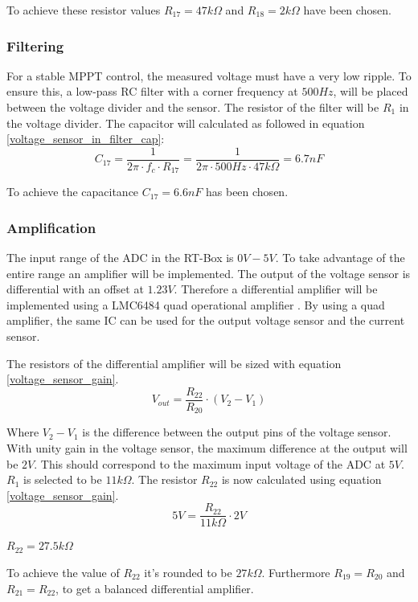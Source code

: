 To achieve these resistor values $R_{17} = 47k\Omega$ and $R_{18} = 2k\Omega$ have been chosen. 

\subsubsection{Filtering} \label{voltage_sensor_filter}
For a stable MPPT control, the measured voltage must have a very low ripple. To ensure this, a low-pass RC filter with a corner frequency at $500Hz$, will be placed between the voltage divider and the sensor. The resistor of the filter will be $R_1$ in the voltage divider. The capacitor will calculated as followed in equation \ref{voltage_sensor_in_filter_cap}:
\begin{equation} \label{voltage_sensor_in_filter_cap}
	C_{17} = \frac{1}{2\pi \cdot f_c \cdot R_{17}} = \frac{1}{2 \pi \cdot 500Hz \cdot 47k\Omega} = 6.7nF
\end{equation}

To achieve the capacitance $C_{17} = 6.6nF$ has been chosen. 

\subsubsection{Amplification} \label{voltage_sensor_amplification}
The input range of the ADC in the RT-Box is $0V-5V$. To take advantage of the entire range an amplifier will be implemented. The output of the voltage sensor is differential with an offset at $1.23V$. Therefore a differential amplifier will be implemented using a LMC6484 quad operational amplifier \cite{sensor_opamp}. By using a quad amplifier, the same IC can be used for the output voltage sensor and the current sensor.

The resistors of the differential amplifier will be sized with equation \ref{voltage_sensor_gain}.
\begin{equation} \label{voltage_sensor_gain}
	V_{out} = \frac{R_{22}}{R_{20}} \cdot (V_2-V_1)
\end{equation}

Where $V_2-V_1$ is the difference between the output pins of the voltage sensor. With unity gain in the voltage sensor, the maximum difference at the output will be $2V$. This should correspond to the maximum input voltage of the ADC at $5V$. $R_1$ is selected to be $11k\Omega$. The resistor $R_{22}$ is now calculated using equation \ref{voltage_sensor_gain}.
\begin{equation}
	5V = \frac{R_{22}}{11k\Omega} \cdot 2V
\end{equation}
\begin{center}
	$R_{22} = 27.5k\Omega$
\end{center}
To achieve the value of $R_{22}$ it's rounded to be $27k\Omega$. Furthermore $R_{19} = R_{20}$ and $R_{21} = R_{22}$, to get a balanced differential amplifier.

